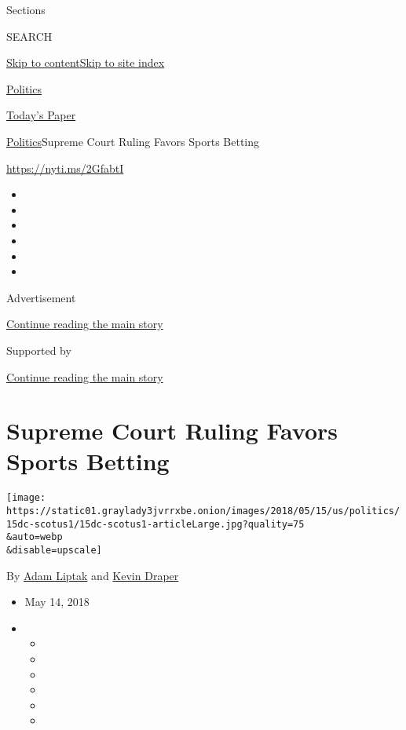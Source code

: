Sections

SEARCH

\protect\hyperlink{site-content}{Skip to
content}\protect\hyperlink{site-index}{Skip to site index}

\href{https://www.nytimes3xbfgragh.onion/section/politics}{Politics}

\href{https://myaccount.nytimes3xbfgragh.onion/auth/login?response_type=cookie\&client_id=vi}{}

\href{https://www.nytimes3xbfgragh.onion/section/todayspaper}{Today's
Paper}

\href{/section/politics}{Politics}\textbar{}Supreme Court Ruling Favors
Sports Betting

\url{https://nyti.ms/2GfabtI}

\begin{itemize}
\item
\item
\item
\item
\item
\item
\end{itemize}

Advertisement

\protect\hyperlink{after-top}{Continue reading the main story}

Supported by

\protect\hyperlink{after-sponsor}{Continue reading the main story}

\hypertarget{supreme-court-ruling-favors-sports-betting}{%
\section{Supreme Court Ruling Favors Sports
Betting}\label{supreme-court-ruling-favors-sports-betting}}

\texttt{[image: https://static01.graylady3jvrrxbe.onion/images/2018/05/15/us/politics/15dc-scotus1/15dc-scotus1-articleLarge.jpg?quality=75\\\&auto=webp\\\&disable=upscale]}

By \href{http://www.nytimes3xbfgragh.onion/by/adam-liptak}{Adam Liptak}
and \href{https://www.nytimes3xbfgragh.onion/by/kevin-draper}{Kevin
Draper}

\begin{itemize}
\item
  May 14, 2018
\item
  \begin{itemize}
  \item
  \item
  \item
  \item
  \item
  \item
  \end{itemize}
\end{itemize}

